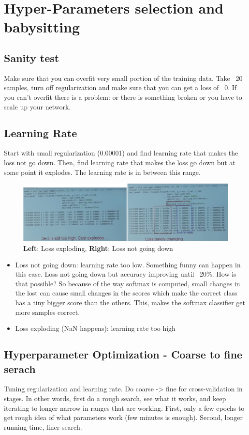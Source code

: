 \chapter{Hyper-Parameters selection and babysitting}

\section*{Sanity test}
Make sure that you can overfit very small portion of the training data. Take ~20 samples, turn off regularization and make sure that you can get a loss of ~0. If you can't overfit there is a problem: or there is something broken or you have to scale up your network.

\section*{Learning Rate}
Start with small regularization (0.00001) and find learning rate that makes the loss not go down.  Then, find learning rate that makes the loss go down but at some point it explodes. The learning rate is in between this range.
\begin{figure}[h]
  \centering
  \includegraphics[width=\textwidth]{Images/hyper_params_tun/9.png}
  \caption{\textbf{Left}: Loss exploding, \textbf{Right}: Loss not going down}
\end{figure}
\begin{itemize}
\item Loss not going down: learning rate too low. Something funny can happen in this case. Loss not going down but accuracy improving until ~20\%. How is that possible? So because of the way softmax is computed, small changes in the lost can cause small changes in the scores which make the correct class has a tiny bigger score than the others. This, makes the softmax classifier get more samples correct.
\item Loss exploding (NaN happens): learning rate too high
\end{itemize}



\section*{Hyperparameter Optimization - Coarse to fine serach}
Tuning regularization and learning rate. Do coarse -> fine for cross-validation in stages. In other words, first do a rough search, see what it works, and keep iterating to longer narrow in ranges that are working. First, only a few epochs to get rough idea of what parameters work (few minutes is enough). Second, longer running time, finer search.

